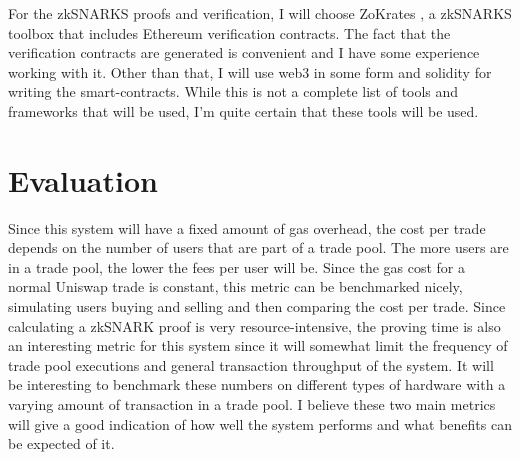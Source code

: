 \documentclass[runningheads]{llncs}
\begin{document}
For the zkSNARKS proofs and verification, I will choose ZoKrates \cite{eberhardt2017zokrates}, a zkSNARKS toolbox that includes Ethereum verification contracts. The fact that the verification contracts are generated is convenient and I have some experience working with it. Other than that, I will use web3 in some form and solidity for writing the smart-contracts. While this is not a complete list of tools and frameworks that will be used, I'm quite certain that these tools will be used.

\section{Evaluation}
Since this system will have a fixed amount of gas overhead, the cost per trade depends on the number of users that are part of a trade pool. The more users are in a trade pool, the lower the fees per user will be. Since the gas cost for a normal Uniswap trade is constant, this metric can be benchmarked nicely, simulating users buying and selling and then comparing the cost per trade. 
Since calculating a zkSNARK proof is very resource-intensive, the proving time is also an interesting metric for this system since it will somewhat limit the frequency of trade pool executions and general transaction throughput of the system. It will be interesting to benchmark these numbers on different types of hardware with a varying amount of transaction in a trade pool. 
I believe these two main metrics will give a good indication of how well the system performs and what benefits can be expected of it. 




\end{document}
